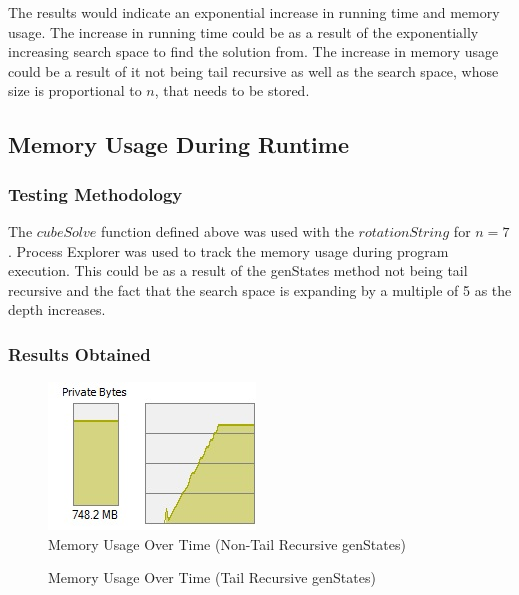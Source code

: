 \documentclass[]{article}
\begin{document}
 The results would indicate an exponential increase in running time and memory usage. The increase in running time could be as a result of the exponentially increasing search space to find the solution from. The increase in memory usage could be a result of it not being tail recursive as well as the search space, whose size is proportional to \(n\), that needs to be stored. 
 
 \subsection{Memory Usage During Runtime}
 \subsubsection{Testing Methodology}
 The \(cubeSolve\) function defined above was used with the \(rotationString\) for \(n = 7\). Process Explorer was used to track the memory usage during program execution. This could be as a result of the genStates method not being tail recursive and the fact that the search space is expanding by a multiple of 5 as the depth increases.
 \subsubsection{Results Obtained}
 
 \begin{figure}[H]
 	\centering
 	\includegraphics[width=0.4\linewidth]{mem_usage2.jpg}
 	\caption{Memory Usage Over Time (Non-Tail Recursive genStates)}
 	\label{fig:memory_usage}
 \end{figure}
 
  \begin{figure}[H]
  	\centering
  	\noindent{}
  	\caption{Memory Usage Over Time (Tail Recursive genStates)}
  	\label{fig:memory_usageTail}
  \end{figure}
\end{document}

